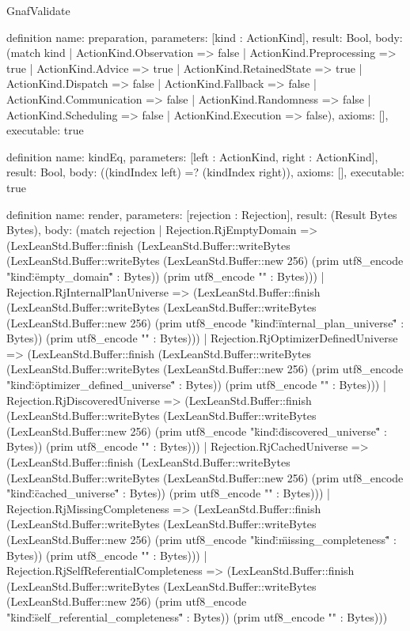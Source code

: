 \begin{lexlean}{GnafValidate}
\begin{semanticmodule}
definition{
  name: preparation,
  parameters: [kind : ActionKind],
  result: Bool,
  body: (match kind
    | ActionKind.Observation => false
    | ActionKind.Preprocessing => true
    | ActionKind.Advice => true
    | ActionKind.RetainedState => true
    | ActionKind.Dispatch => false
    | ActionKind.Fallback => false
    | ActionKind.Communication => false
    | ActionKind.Randomness => false
    | ActionKind.Scheduling => false
    | ActionKind.Execution => false),
  axioms: [],
  executable: true
}

definition{
  name: kindEq,
  parameters: [left : ActionKind, right : ActionKind],
  result: Bool,
  body: ((kindIndex left) =? (kindIndex right)),
  axioms: [],
  executable: true
}

definition{
  name: render,
  parameters: [rejection : Rejection],
  result: (Result Bytes Bytes),
  body: (match rejection
    | Rejection.RjEmptyDomain => (LexLeanStd.Buffer::finish (LexLeanStd.Buffer::writeBytes (LexLeanStd.Buffer::writeBytes (LexLeanStd.Buffer::new 256) (prim utf8_encode "{\"kind\":\"empty_domain\"" : Bytes)) (prim utf8_encode "}" : Bytes)))
    | Rejection.RjInternalPlanUniverse => (LexLeanStd.Buffer::finish (LexLeanStd.Buffer::writeBytes (LexLeanStd.Buffer::writeBytes (LexLeanStd.Buffer::new 256) (prim utf8_encode "{\"kind\":\"internal_plan_universe\"" : Bytes)) (prim utf8_encode "}" : Bytes)))
    | Rejection.RjOptimizerDefinedUniverse => (LexLeanStd.Buffer::finish (LexLeanStd.Buffer::writeBytes (LexLeanStd.Buffer::writeBytes (LexLeanStd.Buffer::new 256) (prim utf8_encode "{\"kind\":\"optimizer_defined_universe\"" : Bytes)) (prim utf8_encode "}" : Bytes)))
    | Rejection.RjDiscoveredUniverse => (LexLeanStd.Buffer::finish (LexLeanStd.Buffer::writeBytes (LexLeanStd.Buffer::writeBytes (LexLeanStd.Buffer::new 256) (prim utf8_encode "{\"kind\":\"discovered_universe\"" : Bytes)) (prim utf8_encode "}" : Bytes)))
    | Rejection.RjCachedUniverse => (LexLeanStd.Buffer::finish (LexLeanStd.Buffer::writeBytes (LexLeanStd.Buffer::writeBytes (LexLeanStd.Buffer::new 256) (prim utf8_encode "{\"kind\":\"cached_universe\"" : Bytes)) (prim utf8_encode "}" : Bytes)))
    | Rejection.RjMissingCompleteness => (LexLeanStd.Buffer::finish (LexLeanStd.Buffer::writeBytes (LexLeanStd.Buffer::writeBytes (LexLeanStd.Buffer::new 256) (prim utf8_encode "{\"kind\":\"missing_completeness\"" : Bytes)) (prim utf8_encode "}" : Bytes)))
    | Rejection.RjSelfReferentialCompleteness => (LexLeanStd.Buffer::finish (LexLeanStd.Buffer::writeBytes (LexLeanStd.Buffer::writeBytes (LexLeanStd.Buffer::new 256) (prim utf8_encode "{\"kind\":\"self_referential_completeness\"" : Bytes)) (prim utf8_encode "}" : Bytes)))
}
\end{semanticmodule}
\end{lexlean}
